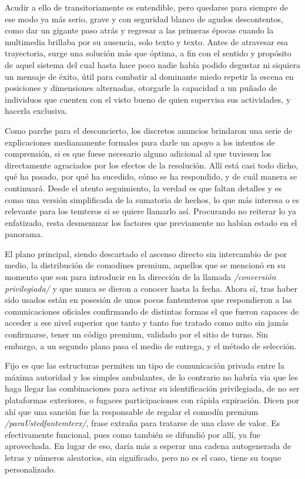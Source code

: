 \documentclass[
]{book}
\begin{document}
Acudir a ello de transitoriamente es entendible, pero quedarse para siempre de ese modo ya más serio, grave y con seguridad blanco de agudos descontentos, como dar un gigante paso atrás y regresar a las primeras épocas cuando la multimedia brillaba por su ausencia, solo texto y texto. Antes de atravesar esa trayectoria, surge una solución más que óptima, a fin con el sentido y propósito de aquel sistema del cual hasta hace poco nadie había podido degustar ni siquiera un mensaje de éxito, útil para combatir al dominante miedo repetir la escena en posiciones y dimensiones alternadas, otorgarle la capacidad a un puñado de individuos que cuenten con el visto bueno de quien supervisa sus actividades, y hacerla exclusiva.

Como parche para el desconcierto, los discretos anuncios brindaron una serie de explicaciones medianamente formales para darle un apoyo a los intentos de comprensión, si es que fuese necesario alguno adicional al que tuviesen los directamente agraciados por los efectos de la resolución. Allí está casi todo dicho, qué ha pasado, por qué ha sucedido, cómo se ha respondido, y de cuál manera se continuará. Desde el atento seguimiento, la verdad es que faltan detalles y es como una versión simplificada de la sumatoria de hechos, lo que más interesa o es relevante para los temteros si se quiere llamarlo así. Procurando no reiterar lo ya enfatizado, resta desmenuzar los factores que previamente no habían estado en el panorama.

El plano principal, siendo descartado el ascenso directo sin intercambio de por medio, la distribución de comodines premium, aquellos que se mencionó en su momento que son para introducir en la dirección de la llamada \emph{/conversión privilegiada/} y que nunca se dieron a conocer hasta la fecha. Ahora sí, tras haber sido usados están en posesión de unos pocos fantemteros que respondieron a las comunicaciones oficiales confirmando de distintas formas el que fueron capaces de acceder a ese nivel superior que tanto y tanto fue tratado como mito sin jamás confirmarse, tener un código premium, validado por el sitio de turno. Sin embargo, a un segundo plano pasa el medio de entrega, y el método de selección.

Fijo es que las estructuras permiten un tipo de comunicación privada entre la máxima autoridad y los simples ambulantes, de lo contrario no habría via que les haga llegar las combinaciones para activar su identificación privilegiada, de no ser plataformas exteriores, o fugaces participaciones con rápida expiración. Dicen por ahí que una sanción fue la responsable de regalar el comodín premium \emph{/paraUstedfantemterx/}, frase extraña para tratarse de una clave de valor. Es efectivamente funcional, pues como también se difundió por allí, ya fue aprovechada. En lugar de eso, daría más a esperar una cadena autogenerada de letras y números aleatorios, sin significado, pero no es el caso, tiene su toque personalizado.
\end{document}
